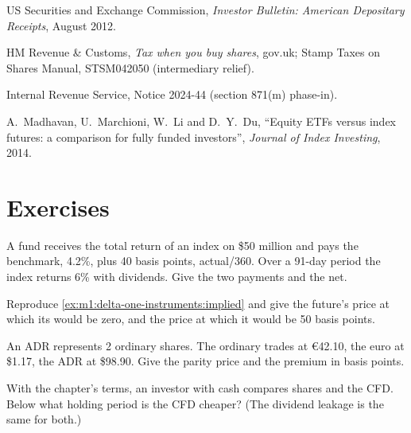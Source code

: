 \begin{omsources}
\item US Securities and Exchange Commission, \emph{Investor Bulletin:
American Depositary Receipts}, August 2012.
\item HM Revenue \& Customs, \emph{Tax when you buy shares}, gov.uk; Stamp
Taxes on Shares Manual, STSM042050 (intermediary relief).
\item Internal Revenue Service, Notice 2024-44 (section 871(m) phase-in).
\item A.~Madhavan, U.~Marchioni, W.~Li and D.~Y.~Du, ``Equity ETFs versus
index futures: a comparison for fully funded investors'', \emph{Journal of
Index Investing}, 2014.
\end{omsources}

\section{Exercises}

\begin{exercise}[$\star$]\label{exo:m1:delta-one-instruments:1}
A fund receives the total return of an index on \$50 million and pays the
benchmark, 4.2\%, plus 40 basis points, actual/360. Over a 91-day period the
index returns 6\% with dividends. Give the two payments and the net.
\end{exercise}

\begin{exercise}[$\star$]\label{exo:m1:delta-one-instruments:2}
Reproduce \cref{ex:m1:delta-one-instruments:implied} and give the future's
price at which its  would be zero, and the price at which it
would be 50 basis points.
\end{exercise}

\begin{exercise}[$\star$]\label{exo:m1:delta-one-instruments:3}
An ADR represents 2 ordinary shares. The ordinary trades at \euro42.10, the
euro at \$1.17, the ADR at \$98.90. Give the parity price and the premium in
basis points.
\end{exercise}

\begin{exercise}[$\star\star$]\label{exo:m1:delta-one-instruments:4}
With the chapter's terms, an investor with cash compares shares and the CFD.
Below what holding period is the CFD cheaper? (The dividend leakage is the
same for both.)
\end{exercise}

